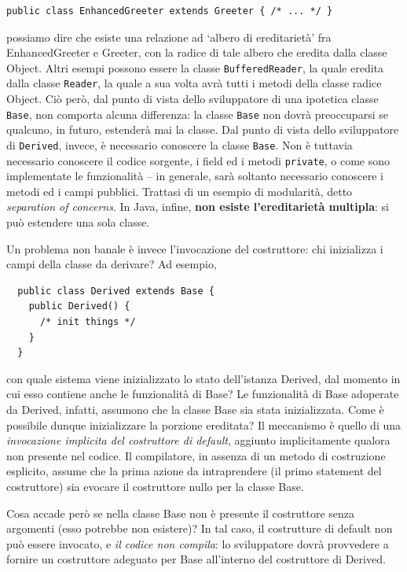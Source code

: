 \documentclass[\fontsizeclass,twocolumn]{\classname}
\theoremstyle{definition}
\theoremstyle{definition}
\begin{document}
\begin{lstlisting}
public class EnhancedGreeter extends Greeter { /* ... */ }
\end{lstlisting}

possiamo dire che esiste una relazione ad `albero di ereditarietà' fra
EnhancedGreeter e Greeter, con la radice di tale albero che eredita dalla classe
Object. Altri esempi possono essere la classe \texttt{BufferedReader}, la quale
eredita dalla classe \texttt{Reader}, la quale a sua volta avrà tutti i metodi
della classe radice Object. Ciò però, dal punto di vista dello sviluppatore di
una ipotetica classe \texttt{Base}, non comporta alcuna differenza: la classe
\texttt{Base} non dovrà preoccuparsi se qualcuno, in futuro, estenderà mai la
classe. Dal punto di vista dello sviluppatore di \texttt{Derived}, invece, è
necessario conoscere la classe \texttt{Base}. Non è tuttavia necessario
conoscere il codice sorgente, i field ed i metodi \texttt{private}, o come sono
implementate le funzionalità \--- in generale, sarà soltanto necessario
conoscere i metodi ed i campi pubblici. Trattasi di un esempio di modularità,
detto \emph{separation of concerns}. In Java, infine, \textbf{non esiste
l'ereditarietà multipla}: si può estendere una sola classe.

Un problema non banale è invece l'invocazione del costruttore: chi inizializza i
campi della classe da derivare? Ad esempio,

\begin{lstlisting}
  public class Derived extends Base {
    public Derived() {
      /* init things */
    }
  }
\end{lstlisting}

con quale sistema viene inizializzato lo stato dell'istanza Derived, dal momento
in cui esso contiene anche le funzionalità di Base? Le funzionalità di Base
adoperate da Derived, infatti, assumono che la classe Base sia stata
inizializzata. Come è possibile dunque inizializzare la porzione ereditata? Il
meccanismo è quello di una \emph{invocazione implicita del costruttore di
default}, aggiunto implicitamente qualora non presente nel codice. Il
compilatore, in assenza di un metodo di costruzione esplicito, assume che la
prima azione da intraprendere (il primo statement del costruttore) sia evocare
il costruttore nullo per la classe Base. 

Cosa accade però se nella classe Base non è presente il costruttore senza
argomenti (esso potrebbe non esistere)? In tal caso, il costrutture di default
non può essere invocato, e \emph{il codice non compila}: lo sviluppatore dovrà
provvedere a fornire un costruttore adeguato per Base all'interno del
costruttore di Derived. 
\end{document}
